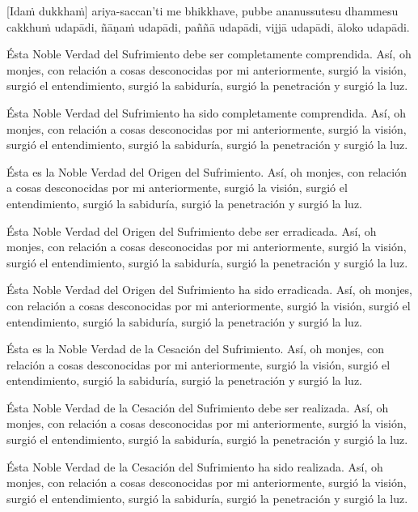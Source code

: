 \enlargethispage{\baselineskip}

[Idaṁ dukkhaṁ] ariya-saccan'ti me bhikkhave, pubbe ananussutesu dhammesu
cakkhuṁ udapādi, ñāṇaṁ udapādi, paññā udapādi, vijjā udapādi, āloko
udapādi.

\clearpage

\englishText
\markboth{\englishTitle}{\rightmark}

Ésta Noble Verdad del Sufrimiento debe ser completamente comprendida. Así, oh monjes, con relación a cosas desconocidas por mi anteriormente, surgió la visión, surgió el entendimiento, surgió la sabiduría, surgió la penetración y surgió la luz.

Ésta Noble Verdad del Sufrimiento ha sido completamente comprendida. Así, oh monjes, con relación a cosas desconocidas por mi anteriormente, surgió la visión, surgió el entendimiento, surgió la sabiduría, surgió la penetración y surgió la luz.

Ésta es la Noble Verdad del Origen del Sufrimiento. Así, oh monjes, con relación a cosas desconocidas por mi anteriormente, surgió la visión, surgió el entendimiento, surgió la sabiduría, surgió la penetración y surgió la luz.

Ésta Noble Verdad del Origen del Sufrimiento debe ser erradicada. Así, oh monjes, con relación a cosas desconocidas por mi anteriormente, surgió la visión, surgió el entendimiento, surgió la sabiduría, surgió la penetración y surgió la luz.

Ésta Noble Verdad del Origen del Sufrimiento ha sido erradicada. Así, oh monjes, con relación a cosas desconocidas por mi anteriormente, surgió la visión, surgió el entendimiento, surgió la sabiduría, surgió la penetración y surgió la luz.

Ésta es la Noble Verdad de la Cesación del Sufrimiento. Así, oh monjes, con relación a cosas desconocidas por mi anteriormente, surgió la visión, surgió el entendimiento, surgió la sabiduría, surgió la penetración y surgió la luz.

Ésta Noble Verdad de la Cesación del Sufrimiento debe ser realizada. Así, oh monjes, con relación a cosas desconocidas por mi anteriormente, surgió la visión, surgió el entendimiento, surgió la sabiduría, surgió la penetración y surgió la luz.

\enlargethispage*{2\baselineskip}

Ésta Noble Verdad de la Cesación del Sufrimiento ha sido realizada. Así, oh monjes, con relación a cosas desconocidas por mi anteriormente, surgió la visión, surgió el entendimiento, surgió la sabiduría, surgió la penetración y surgió la luz.

